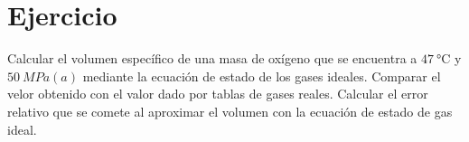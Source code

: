 \section{Ejercicio}\label{ej:Chap03Ejercicio02}

Calcular el volumen específico de una masa de oxígeno que se encuentra a $\SI{47}{\celsius}$ y $\SI{50}{MPa(a)}$ mediante la ecuación de estado de los gases ideales. Comparar el velor obtenido con el valor dado por tablas de gases reales. Calcular el error relativo que se comete al aproximar el volumen con la ecuación de estado de gas ideal.